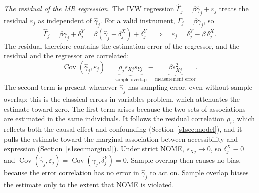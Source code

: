 \noindent \textit{The residual of the MR regression.} The IVW regression $\hat{\Gamma}_j=\beta\hat{\gamma}_j+\varepsilon_j$ treats the residual $\varepsilon_j$ as independent of $\hat{\gamma}_j$. For a valid instrument, $\Gamma_j=\beta\gamma_j$, so
\begin{equation*}
\hat{\Gamma}_j=\beta\gamma_j+\delta^Y_j=\beta(\hat{\gamma}_j-\delta^X_j)+\delta^Y_j
\quad\Longrightarrow\quad
\varepsilon_j=\delta^Y_j-\beta\,\delta^X_j .
\end{equation*}
The residual therefore contains the estimation error of the regressor, and the residual and the regressor are correlated:
\begin{equation*}
\operatorname{Cov}(\hat{\gamma}_j,\varepsilon_j)
=\underbrace{\rho_j s_{Xj}s_{Yj}}_{\text{sample overlap}}
-\underbrace{\beta s_{Xj}^2}_{\text{measurement error}}.
\end{equation*}
The second term is present whenever $\hat{\gamma}_j$ has sampling error, even without sample overlap; this is the classical errors-in-variables problem, which attenuates the estimate toward zero. The first term arises because the two sets of associations are estimated in the same individuals. It follows the residual correlation $\rho_\varepsilon$, which reflects both the causal effect and confounding (Section~\ref{s1sec:model}), and it pulls the estimate toward the marginal association between accessibility and expression (Section~\ref{s1sec:marginal}). Under strict NOME, $s_{Xj}\to0$, so $\delta^X_j\equiv0$ and $\operatorname{Cov}(\hat{\gamma}_j,\varepsilon_j)=\operatorname{Cov}(\gamma_j,\delta^Y_j)=0$. Sample overlap then causes no bias, because the error correlation has no error in $\hat{\gamma}_j$ to act on. Sample overlap biases the estimate only to the extent that NOME is violated.

